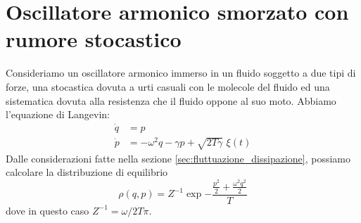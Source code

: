 \documentclass[10pt,a4paper]{article}
\begin{document}
\section{Oscillatore armonico smorzato con rumore stocastico}
Consideriamo un oscillatore armonico immerso in un fluido soggetto a due tipi di forze, una stocastica dovuta a urti casuali con le molecole del fluido ed una sistematica dovuta alla resistenza che il fluido oppone al suo moto. Abbiamo l'equazione di Langevin:
\begin{align}
	\dot{q} &= p\\
	\dot{p} &= -\omega^2 q - \gamma p + \sqrt{2T\gamma}\,\,\xi(t)
\end{align}
Dalle considerazioni fatte nella sezione \ref{sec:fluttuazione_dissipazione}, possiamo calcolare la distribuzione di equilibrio
\begin{equation}
	\rho(q,p) = Z^{-1} \exp{-\frac{\frac{p^2}{2}+\frac{\omega^2q^2}{2}}{T}}
\end{equation}
dove in questo caso $Z^{-1}=\omega/2T\pi$.
\end{document}
